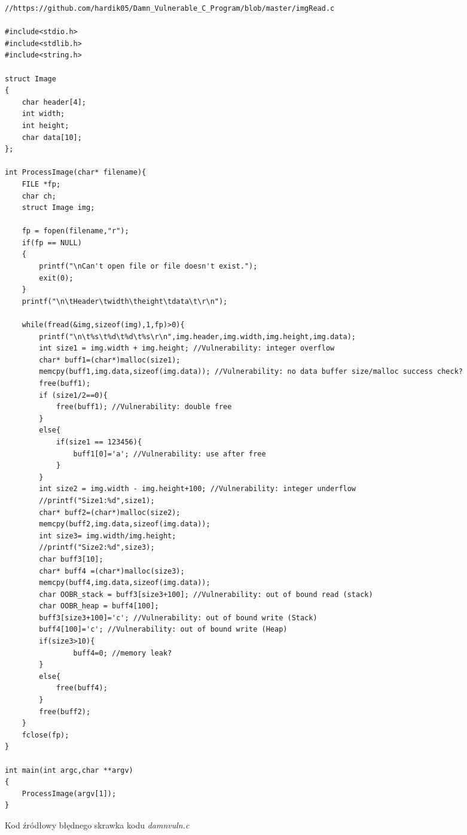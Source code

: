 \begin{listing}
  \begin{verbatim}
//https://github.com/hardik05/Damn_Vulnerable_C_Program/blob/master/imgRead.c

#include<stdio.h>
#include<stdlib.h>
#include<string.h>

struct Image
{
	char header[4];
	int width;
	int height;
	char data[10];
};

int ProcessImage(char* filename){
	FILE *fp;
	char ch;
	struct Image img;

	fp = fopen(filename,"r"); 
	if(fp == NULL)
	{
		printf("\nCan't open file or file doesn't exist.");
		exit(0);
	}
	printf("\n\tHeader\twidth\theight\tdata\t\r\n");

	while(fread(&img,sizeof(img),1,fp)>0){
		printf("\n\t%s\t%d\t%d\t%s\r\n",img.header,img.width,img.height,img.data);
		int size1 = img.width + img.height; //Vulnerability: integer overflow
		char* buff1=(char*)malloc(size1);
		memcpy(buff1,img.data,sizeof(img.data)); //Vulnerability: no data buffer size/malloc success check?
		free(buff1);
		if (size1/2==0){
			free(buff1); //Vulnerability: double free
		}
		else{
			if(size1 == 123456){
				buff1[0]='a'; //Vulnerability: use after free
			}
		}
		int size2 = img.width - img.height+100; //Vulnerability: integer underflow
		//printf("Size1:%d",size1);
		char* buff2=(char*)malloc(size2);
		memcpy(buff2,img.data,sizeof(img.data));
		int size3= img.width/img.height;
		//printf("Size2:%d",size3);
		char buff3[10];
		char* buff4 =(char*)malloc(size3);
		memcpy(buff4,img.data,sizeof(img.data));
		char OOBR_stack = buff3[size3+100]; //Vulnerability: out of bound read (stack)
		char OOBR_heap = buff4[100];
		buff3[size3+100]='c'; //Vulnerability: out of bound write (Stack)
		buff4[100]='c'; //Vulnerability: out of bound write (Heap)
		if(size3>10){
				buff4=0; //memory leak?
		}
		else{
			free(buff4);
		}
		free(buff2);
	}
	fclose(fp);
}

int main(int argc,char **argv)
{
	ProcessImage(argv[1]);
}
\end{verbatim}
\caption{Kod źródłowy błędnego skrawka kodu \textit{damnvuln.c}}
\label{lst:code1}
\end{listing}
\restoregeometry

